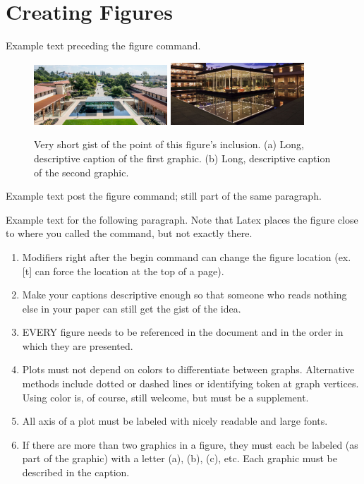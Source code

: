 \chapter{Creating Figures}\label{Ch:creating_figures}

Example text preceding the figure command.
%
\begin{figure}%
    \centering
    \includegraphics[width=5cm]{Graphic1.jpg}
    \qquad %
    \includegraphics[width=5cm]{Graphic2.jpg}
    \caption{Very short gist of the point of this figure's inclusion. (a) Long, descriptive caption of the first graphic. (b) Long, descriptive caption of the second graphic.}
    \label{FIG_DESCRIPTIVELABEL}
\end{figure}
%
Example text post the figure command; still part of the same paragraph.

Example text for the following paragraph. Note that Latex places the figure close to where you called the command, but not exactly there. 

\begin{enumerate}
    \item Modifiers right after the begin command can change the figure location (ex. [t] can force the location at the top of a page).
    \item Make your captions descriptive enough so that someone who reads nothing else in your paper can still get the gist of the idea.
    \item EVERY figure needs to be referenced in the document and in the order in which they are presented.
    \item Plots must not depend on colors to differentiate between graphs. Alternative methods include dotted or dashed lines or identifying token at graph vertices. Using color is, of course, still welcome, but must be a supplement.
    \item All axis of a plot must be labeled with nicely readable and large fonts.
    \item If there are more than two graphics in a figure, they must each be labeled (as part of the graphic) with a letter (a), (b), (c), etc. Each graphic must be described in the caption.
\end{enumerate}





\endinput
